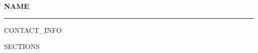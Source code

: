 \documentclass{article}
\newcommand{\name}[1]{
\textbf{{\Large #1}}
\vspace{3pt}
\hrule}
\begin{document}
\name{NAME}

CONTACT_INFO

SECTIONS
\end{document}
